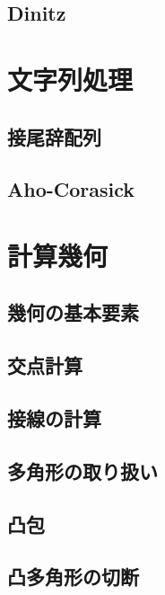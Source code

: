 \documentclass[landscape,twocolumn,9pt]{jsarticle}
\begin{document}
\subsection{Dinitz}


\section{文字列処理}

\subsection{接尾辞配列}


\subsection{Aho-Corasick}


\section{計算幾何}

\subsection{幾何の基本要素}


\subsection{交点計算}


\subsection{接線の計算}


\subsection{多角形の取り扱い}


\subsection{凸包}


\subsection{凸多角形の切断}

\end{document}

